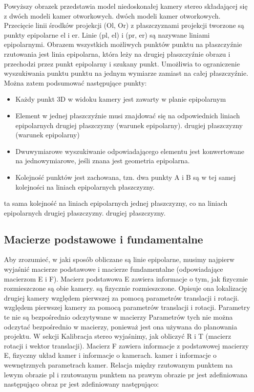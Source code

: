 \documentclass[magisterska]{pracadypl}
\begin{document}
Powyższy obrazek przedstawia model niedoskonałej kamery stereo składającej się z dwóch modeli kamer otworkowych.
dwóch modeli kamer otworkowych. Przecięcie linii środków projekcji
(Ol, Or) z płaszczyznami projekcji tworzone są punkty epipolarne el i er. Linie (pl,
el) i (pr, er) są nazywane liniami epipolarnymi. Obrazem wszystkich możliwych punktów punktu
na płaszczyźnie rzutowania jest linia epipolarna, która leży na drugiej płaszczyźnie obrazu i
przechodzi przez punkt epipolarny i szukany punkt. Umożliwia to ograniczenie wyszukiwania punktu
punktu na jednym wymiarze zamiast na całej płaszczyźnie.
Można zatem podsumować następujące punkty:

\begin{itemize}
  \item Każdy punkt 3D w widoku kamery jest zawarty w planie epipolarnym
  \item Element w jednej płaszczyźnie musi znajdować się na odpowiednich liniach epipolarnych drugiej płaszczyzny (warunek epipolarny).
drugiej płaszczyzny (warunek epipolarny)
  \item Dwuwymiarowe wyszukiwanie odpowiadającego elementu jest konwertowane na
jednowymiarowe, jeśli znana jest geometria epipolarna.
  \item Kolejność punktów jest zachowana, tzn. dwa punkty A i B są w tej samej kolejności na liniach epipolarnych płaszczyzny.

\end{itemize}

ta sama kolejność na liniach epipolarnych jednej płaszczyzny, co na liniach epipolarnych drugiej płaszczyzny.
drugiej płaszczyzny.

\subsection{Macierze podstawowe i fundamentalne}

Aby zrozumieć, w jaki sposób obliczane są linie epipolarne, musimy najpierw wyjaśnić macierze podstawowe
i macierze fundamentalne (odpowiadające macierzom E i F).
Macierz podstawowa E zawiera informacje o tym, jak fizycznie rozmieszczone są obie kamery.
są fizycznie rozmieszczone. Opisuje ona lokalizację drugiej kamery względem pierwszej za pomocą parametrów translacji i rotacji.
względem pierwszej kamery za pomocą parametrów translacji i rotacji. Parametry te nie są bezpośrednio odczytywane w macierzy
Parametrów tych nie można odczytać bezpośrednio w macierzy, ponieważ jest ona używana do planowania projektu. W sekcji Kalibracja stereo
wyjaśnimy, jak obliczyć R i T (macierz rotacji i wektor translacji).
Macierz F zawiera informacje z podstawowej macierzy E, fizyczny układ kamer i informacje o kamerach.
kamer i informacje o wewnętrznych parametrach kamer.
Relacja między rzutowanym punktem na lewym obrazie pl i rzutowanym punktem na prawym obrazie pr jest zdefiniowana następująco
obraz pr jest zdefiniowany następująco:
\end{document}
